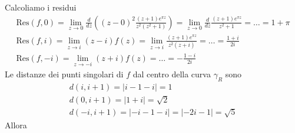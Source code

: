 \begin{figure}[htpb]
\end{figure}
\FloatBarrier

Calcoliamo i residui
\begin{gather*}
\mathrm{Res}\left( f,0\right) =\lim _{z\rightarrow 0}\frac{d}{dz}\left(\left( z-0\right)^{2}\frac{\left( z+1\right) e^{\pi z}}{z^{2}\left( z^{2} +1\right)}\right) =\lim _{z\rightarrow 0}\frac{d}{dz}\frac{\left( z+1\right) e^{\pi z}}{z^{2} +1} =\dotsc =1+\pi \\
\mathrm{Res}\left( f,i\right) =\lim _{z\rightarrow i}\left( z-i\right) f\left( z\right) =\lim _{z\rightarrow i}\frac{\left( z+1\right) e^{\pi z}}{z^{2}\left( z+i\right)} =\dotsc =\frac{1+i}{2i}\\
\mathrm{Res}\left( f,-i\right) =\lim _{z\rightarrow -i}\left( z+i\right) f\left( z\right) =\dotsc =-\frac{1-i}{2i}
\end{gather*}
Le distanze dei punti singolari di $f$ dal centro della curva $\gamma _{R}$ sono
\begin{gather*}
d\left( i,i+1\right) =\left| i-1-i\right| =1\\
d\left( 0,i+1\right) =\left| 1+i\right| =\sqrt{2}\\
d\left( -i,i+1\right) =\left| -i-1-i\right| =\left| -2i-1\right| =\sqrt{5}
\end{gather*}
Allora

